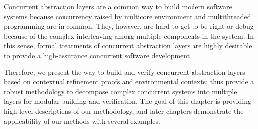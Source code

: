 Concurrent abstraction layers are a common way to build modern software systems because concurrency raised by multicore environment and multithreaded programming are in common.
They, however, are hard to get to be right or debug because of the complex interleaving among multiple components in the system. 
In this sense, formal treatments of concurrent abstraction layers are highly desirable to provide a 
high-assurance concurrent software development. 

Therefore, we present the way to build and verify concurrent abstraction layers 
based on contextual refinement proofs and environmental contexts;
thus provide a robust methodology to decompose complex concurrent systems into multiple layers for modular building and verification.
The goal of this chapter is providing high-level descriptions of our methodology,
and later chapters demonstrate the applicability of our methods with several examples.
